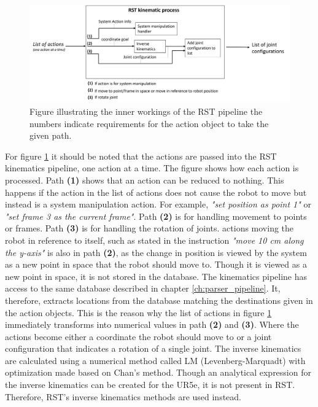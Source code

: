 \begin{figure}[ht]
    \centering
    \includegraphics[width=15cm]{img/RST_pipeline.png}
    \caption{Figure illustrating the inner workings of the RST pipeline the numbers indicate requirements for the action object to take the given path.}
    \label{fig:RST_kin_pipeline}
\end{figure}
For figure \ref{fig:RST_kin_pipeline} it should be noted that the actions are passed into the RST kinematics pipeline, one action at a time. The figure shows how each action is processed.
Path \textbf{(1)} shows that an action can be reduced to nothing. This happens if the action in the list of actions does not cause the robot to move but instead is a system manipulation action. For example, \textit{"set position as point 1"} or \textit{"set frame 3 as the current frame"}.
Path \textbf{(2)} is for handling movement to points or frames.
Path \textbf{(3)} is for handling the rotation of joints.
actions moving the robot in reference to itself, such as stated in the instruction \textit{"move 10 cm along the y-axis"} is also in path \textbf{(2)}, as the change in position is viewed by the system as a new point in space that the robot should move to. Though it is viewed as a new point in space, it is not stored in the database.
The kinematics pipeline has access to the same database described in chapter \ref{ch:parser_pipeline}. It, therefore, extracts locations from the database matching the destinations given in the action objects. This is the reason why the list of actions in figure \ref{fig:RST_kin_pipeline} immediately transforms into numerical values in path \textbf{(2)} and \textbf{(3)}. Where the actions become either a coordinate the robot should move to or a joint configuration that indicates a rotation of a single joint.
The inverse kinematics are calculated using a numerical method called LM (Levenberg-Marquadt) with optimization made based on Chan's method.
Though an analytical expression for the inverse kinematics can be created for the UR5e, it is not present in RST. Therefore, RST's inverse kinematics methods are used instead.
